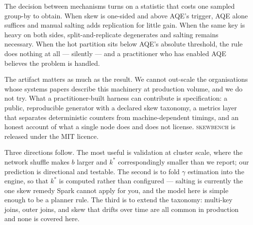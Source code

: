 The decision between mechanisms turns on a statistic that costs one sampled
group-by to obtain. When skew is one-sided and above AQE's trigger, AQE alone
suffices and manual salting adds replication for little gain. When the same key
is heavy on both sides, split-and-replicate degenerates and salting remains
necessary. When the hot partition sits below AQE's absolute threshold, the rule
does nothing at all --- silently --- and a practitioner who has enabled AQE
believes the problem is handled.

The artifact matters as much as the result. We cannot out-scale the
organisations whose systems papers describe this machinery at production
volume, and we do not try. What a practitioner-built harness can contribute is
specification: a public, reproducible generator with a declared skew taxonomy,
a metrics layer that separates deterministic counters from machine-dependent
timings, and an honest account of what a single node does and does not license.
\textsc{skewbench} is released under the MIT licence.

Three directions follow. The most useful is validation at cluster scale, where
the network shuffle makes $b$ larger and $k^{*}$ correspondingly smaller than
we report; our prediction is directional and testable. The second is to fold
$\gamma$ estimation into the engine, so that $k^{*}$ is computed rather than
configured --- salting is currently the one skew remedy Spark cannot apply for
you, and the model here is simple enough to be a planner rule. The third is to
extend the taxonomy: multi-key joins, outer joins, and skew that drifts over
time are all common in production and none is covered here.
